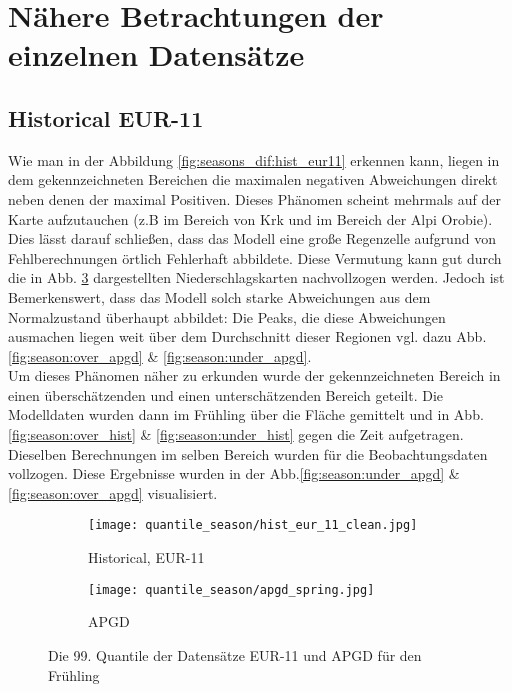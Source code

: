 \section{Nähere Betrachtungen der einzelnen Datensätze}
\subsection{Historical EUR-11} \label{subsec:hist_eur11}
Wie man in der Abbildung \ref{fig:seasons_dif:hist_eur11} erkennen kann, liegen in dem gekennzeichneten Bereichen die maximalen negativen Abweichungen direkt neben denen der maximal Positiven. Dieses Phänomen scheint mehrmals auf der Karte aufzutauchen (z.B im Bereich von Krk und im Bereich der Alpi Orobie). Dies lässt darauf schließen, dass das Modell eine große Regenzelle aufgrund von Fehlberechnungen örtlich Fehlerhaft abbildete. Diese Vermutung kann gut durch die in Abb. \ref{fig:seasons_hist} dargestellten Niederschlagskarten nachvollzogen werden. Jedoch ist Bemerkenswert, dass das Modell solch starke Abweichungen aus dem Normalzustand überhaupt abbildet: Die Peaks, die diese Abweichungen ausmachen liegen weit über dem Durchschnitt dieser Regionen vgl. dazu Abb.\ref{fig:season:over_apgd} \& \ref{fig:season:under_apgd}.\\
Um dieses Phänomen näher zu erkunden wurde der gekennzeichneten Bereich in einen überschätzenden und einen unterschätzenden Bereich geteilt. Die Modelldaten wurden dann im Frühling über die Fläche gemittelt und in Abb.\ref{fig:season:over_hist} \& \ref{fig:season:under_hist} gegen die Zeit aufgetragen. Dieselben Berechnungen im selben Bereich wurden für die Beobachtungsdaten vollzogen. Diese Ergebnisse wurden in der Abb.\ref{fig:season:under_apgd} \& \ref{fig:season:over_apgd} visualisiert.\\
\begin{figure}[h]
	\begin{subfigure}{0.49\textwidth}
		\texttt{[image: quantile\_season/hist\_eur\_11\_clean.jpg]}
		\caption{Historical, EUR-11}
		\label{fig:seasons_hist:hist}
	\end{subfigure}
	\begin{subfigure}{0.49\textwidth}
		\texttt{[image: quantile\_season/apgd\_spring.jpg]}
		\caption{APGD}
		\label{fig:seasons_hist:apgd}
	\end{subfigure}
	\caption{Die 99. Quantile der Datensätze EUR-11 und APGD für den Frühling}
	\label{fig:seasons_hist}
\end{figure}
